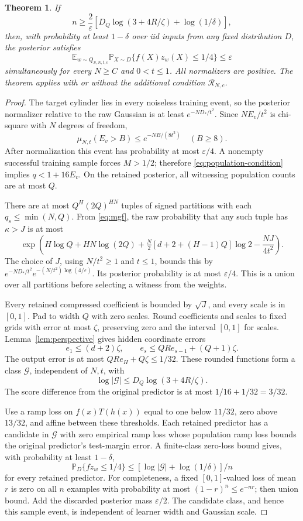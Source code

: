 \documentclass[11pt]{article}
\newtheorem{theorem}{Theorem}
\newcommand{\E}{\mathbb E}
\newcommand{\Prb}{\mathbb P}
\begin{document}
\begin{theorem}\label{thm:main}
If
\[
 n\ge\frac2\varepsilon
       [D_Q\log(3+4R/\zeta)+\log(1/\delta)],
\]
then, with probability at least $1-\delta$ over iid inputs from any
fixed distribution $D$, the posterior satisfies
\[
 \E_{w\sim Q_{S,N,t,c}}\Prb_{X\sim D}\{f(X)z_w(X)\le1/4\}\le\varepsilon
\]
simultaneously for every $N\ge C$ and $0<t\le1$. All normalizers are
positive. The theorem applies with or without the additional condition
$\mathcal R_{N,c}$.
\end{theorem}
\begin{proof}
The target cylinder lies in every noiseless training event, so the posterior
normalizer relative to the raw Gaussian is at least $e^{-ND_*/t^2}$.
Since $NE_v/t^2$ is chi-square with $N$ degrees of freedom,
\[
 \mu_{N,t}(E_v>B)\le e^{-NB/(8t^2)}\quad(B\ge8).
\]
After normalization this event has probability at most $\varepsilon/4$.
A nonempty successful training sample forces $M>1/2$; therefore
\eqref{eq:population-condition} implies $q<1+16E_v$. On the retained
posterior, all witnessing population counts are at most $Q$.

There are at most $Q^H(2Q)^{HN}$ tuples of signed partitions with each
$q_s\le\min(N,Q)$. From \eqref{eq:mgf}, the raw probability that any such
tuple has $\kappa>J$ is at most
\[
 \exp\left(H\log Q+HN\log(2Q)
 +\tfrac N2[d+2+(H-1)Q]\log2-\frac{NJ}{4t^2}\right).
\]
The choice of $J$, using $N/t^2\ge1$ and $t\le1$, bounds this by
$e^{-ND_*/t^2}e^{-(N/t^2)\log(4/\varepsilon)}$. Its posterior probability
is at most $\varepsilon/4$. This is a union over all partitions before
selecting a witness from the weights.

Every retained compressed coefficient is bounded by $\sqrt J$, and every
scale is in $[0,1]$. Pad to width $Q$ with zero scales. Round coefficients
and scales to fixed grids with error at most $\zeta$, preserving zero and
the interval $[0,1]$ for scales. Lemma~\ref{lem:perspective} gives hidden
coordinate errors
\[
 e_1\le(d+2)\zeta,\qquad
 e_s\le QR e_{s-1}+(Q+1)\zeta.
\]
The output error is at most $QR e_H+Q\zeta\le1/32$. These rounded
functions form a class $\mathcal G$, independent of $N,t$, with
\[
 \log|\mathcal G|\le D_Q\log(3+4R/\zeta).
\]
The score difference from the original predictor is at most
$1/16+1/32=3/32$.

Use a ramp loss on $f(x)T(h(x))$ equal to one below $11/32$, zero above
$13/32$, and affine between these thresholds. Each retained predictor has
a candidate in $\mathcal G$ with zero empirical ramp loss whose population
ramp loss bounds the original predictor's test-margin error. A finite-class
zero-loss bound gives, with probability at least $1-\delta$,
\[
 \Prb_D\{fz_w\le1/4\}
 \le [\log|\mathcal G|+\log(1/\delta)]/n
\]
for every retained predictor. For completeness, a fixed $[0,1]$-valued loss
of mean $r$ is zero on all $n$ examples with probability at most
$(1-r)^n\le e^{-nr}$; then union bound. Add the discarded posterior mass
$\varepsilon/2$. The candidate class, and hence this sample event, is
independent of learner width and Gaussian scale.
\end{proof}
\end{document}
